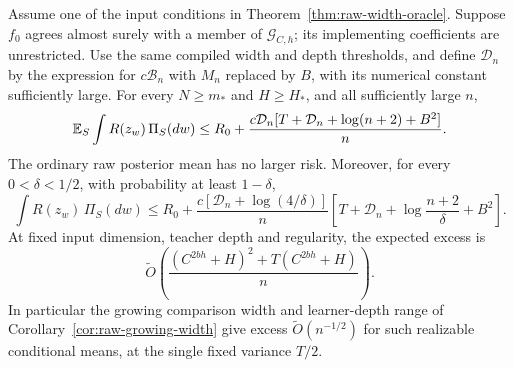 \begin{theorem}
\label{thm:raw-realizable-compiler}
Assume one of the input conditions in Theorem~\ref{thm:raw-width-oracle}.
Suppose $f_0$ agrees almost surely with a member of
$\mathcal G_{C,h}$; its implementing coefficients are unrestricted.
Use the same compiled width and depth thresholds, and define $\mathcal D_n$
by the expression for $c\mathcal B_n$ with $M_n$ replaced by $B$, with
its numerical constant sufficiently large.  For every $N\ge m_*$ and
$H\ge H_*$, and all sufficiently large $n$,
\[
 \mathbb E_S\int R(z_w)\,\Pi_S(dw)
 \le R_0+\frac{c\mathcal D_n[T+\mathcal D_n+\log(n+2)+B^2]}n.
\]
The ordinary raw posterior mean has no larger risk.  Moreover, for every
$0<\delta<1/2$, with probability at least $1-\delta$,
\[
 \int R(z_w)\,\Pi_S(dw)
 \le R_0+\frac{c[\mathcal D_n+\log(4/\delta)]}{n}
       \left[T+\mathcal D_n+\log\frac{n+2}{\delta}+B^2\right].
\]
At fixed input dimension, teacher depth and regularity, the expected
excess is
\[
 \widetilde O\left(\frac{(C^{2bh}+H)^2+T(C^{2bh}+H)}n\right).
\]
In particular the growing comparison width and learner-depth range of
Corollary~\ref{cor:raw-growing-width} give excess
$\widetilde O(n^{-1/2})$ for such realizable conditional means, at the
single fixed variance $T/2$.
\end{theorem}
